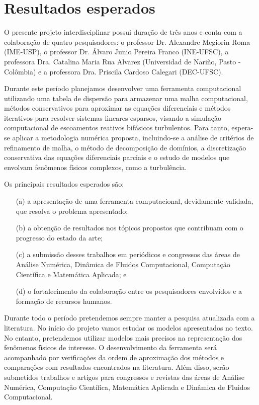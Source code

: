 \documentclass[12pt, brazil]{article}
\begin{document}
\section{Resultados esperados}\label{ss.conclusao}

\hspace{1pc} O presente projeto interdisciplinar possui duração de três anos e conta com a colaboração de quatro pesquisadores: o professor Dr. Alexandre Megiorin Roma (IME-USP), o professor Dr. Álvaro Junio Pereira Franco (INE-UFSC), a professora Dra. Catalina Maria Rua Alvarez (Universidad de Nari\~no, Pasto - Colômbia) e a professora Dra. Priscila Cardoso Calegari (DEC-UFSC).  

Durante este período planejamos desenvolver uma ferramenta computacional utilizando uma tabela de dispersão para armazenar uma malha computacional, métodos conservativos para aproximar as equações diferenciais e métodos iterativos para resolver sistemas lineares esparsos, visando a simulação computacional de escoamentos reativos bifásicos turbulentos. Para tanto, espera-se aplicar a metodologia numérica proposta, incluindo-se a análise de critérios de refinamento de malha, o método de decomposição de domínios, a discretização conservativa das equações diferenciais parciais e o estudo de modelos que envolvam fenômenos físicos complexos, como a turbulência. 

Os principais resultados esperados são:
\begin{enumerate}
  \vspace{-1pc}
\item [(a)] a apresentação de uma ferramenta computacional, devidamente validada, que resolva o problema apresentado;
  \vspace{-0.5pc}
  \item [(b)] a obtenção de resultados nos tópicos propostos que contribuam com o progresso do estado da arte; 
  \vspace{-0.5pc}
\item [(c)] a submissão desses trabalhos em periódicos e congressos das áreas de Análise Numérica, Dinâmica de Fluidos Computacional, Computação Científica e Matemática Aplicada; e 
  \vspace{-0.5pc}
  \item [(d)] o fortalecimento da colaboração entre os pesquisadores envolvidos e a formação de recursos humanos.
  \end{enumerate}

Durante todo o período pretendemos sempre manter a pesquisa atualizada com a literatura. No início do projeto vamos estudar os modelos apresentados no texto. No entanto, pretendemos utilizar modelos mais precisos na representação dos fenômenos físicos de interesse. O desenvolvimento da ferramenta será acompanhado por verificações da ordem de aproximação dos métodos e comparações com resultados encontrados na literatura. Além disso, serão submetidos trabalhos e artigos para congressos e revistas das áreas de Análise Numérica, Computação Científica, Matemática Aplicada e Dinâmica de Fluidos Computacional. 

\begin{footnotesize}


\end{footnotesize}
\end{document}
